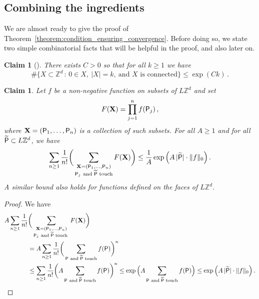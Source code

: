 \documentclass[11pt]{article}
\newtheorem{claim}[theorem]{Claim}
\theoremstyle{definition}
\theoremstyle{remark}
\numberwithin{theorem}{section}
\newcommand{\bZ}{\mathbb Z}
\begin{document}
    \subsection{Combining the ingredients}
    We are almost ready to give the proof of Theorem~\ref{theorem:condition_ensuring_convergence}. Before doing so, we state two simple combinatorial facts that will be helpful in the proof, and also later on. 
    \begin{claim}[{\cite[Proposition~V.7.14]{Simon-book}}]
        \label{claim:bound_on_the_number_of_connected_sets}
        There exists $C>0$ so that for all $k\ge 1$ we have
        \[
        \# \big\{ X\subset \bZ^d \, : \, 0\in X, \   |X| = k, \ \text{and $X$ is connected} \big\} \le \exp(C k) \, .
        \]
    \end{claim}
    \begin{claim}
    \label{claim:bound_on_function_on_collection_of_subsets}
        Let $f$ be a non-negative function on subsets of $L\bZ^d$ and set
        \[
        F(\mathbf{X}) = \prod_{j=1}^n f({\sf P}_j) \, ,
        \]
        where $\mathbf{X} = ({\sf P}_1,\ldots,{\sf P}_n)$ is a collection of such  
        subsets. For all $A\ge 1$ and for all $\widetilde{{\sf P}} \subset L\bZ^d$, we have
        \[
        \sum_{n\ge 1} \frac{1}{n!} \bigg(\sum_{\substack{\mathbf{X} = ({\sf P}_1,\ldots,{\sf P}_n) \\ {\sf P}_j \  \text{and $\widetilde{{\sf P}}$ touch}}} F(\mathbf{X}) \bigg) \le \frac{1}{A} \exp\Big(A \, |\widetilde{{\sf P}}| \cdot \|f\|_0\Big) \, .
        \]
        A similar bound also holds for functions defined on the faces of $L\bZ^d$. 
    \end{claim}
    \begin{proof}
    We have
    \begin{align*}
        A \sum_{n\ge 1} \frac{1}{n!} & \bigg(\sum_{\substack{\mathbf{X} = ({\sf P}_1,\ldots,{\sf P}_n) \\ {\sf P}_j \  \text{and $\widetilde{{\sf P}}$ touch }}} F(\mathbf{X}) \bigg) \\ & = A \sum_{n\ge 1} \frac{1}{n!} \bigg(\sum_{{\sf P} \  \text{and $\widetilde{{\sf P}}$ touch}} f({\sf P}) \bigg)^n \\ &\le \sum_{n\ge 1} \frac{1}{n!} \bigg( A \sum_{{\sf P} \  \text{and $\widetilde{{\sf P}}$ touch}}   f({\sf P}) \bigg)^n \le \exp\Big(A \sum_{{\sf P} \  \text{and $\widetilde{{\sf P}}$ touch}}   f({\sf P}) \Big) \le \exp\Big(A \, |\widetilde{{\sf P}}| \cdot  \| f \|_0 \Big) \, .
    \end{align*}
    \end{proof}
\end{document}
